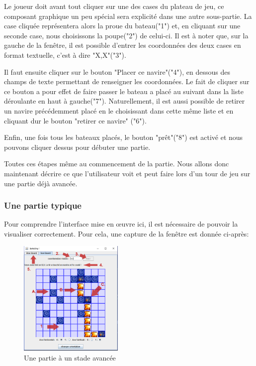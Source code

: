 	Le  joueur doit avant tout cliquer sur une des cases du plateau de jeu, ce composant graphique un peu spécial sera explicité dans une autre sous-partie. La case cliquée représentera alors la proue du bateau("1") et, en cliquant sur une seconde case, nous choisissons la poupe("2") de celui-ci. Il est à noter que, sur la gauche de la fenêtre, il est possible d'entrer les coordonnées des deux cases en format textuelle, c'est à dire "X,X"("3").
	\newline
	
	Il faut ensuite cliquer sur le bouton "Placer ce navire"("4"), en dessous des champs de texte permettant de renseigner les coordonnées. Le fait de cliquer sur ce bouton a pour effet de faire passer le bateau a placé au suivant dans la liste déroulante en haut à gauche("7"). Naturellement, il est aussi possible de retirer un navire précédemment placé en le choisissant dans cette même liste et en cliquant dur le bouton "retirer ce navire" ("6").
	\newline
	
	Enfin, une fois tous les bateaux placés, le bouton "prêt"("8") est activé et nous pouvons cliquer dessus pour débuter une partie.
	\newline
	
	Toutes ces étapes même au commencement de la partie. Nous allons donc maintenant décrire ce que l'utilisateur voit et peut faire lors d'un tour de jeu sur une partie déjà avancée.
	
	\subsubsection{Une partie typique}
	Pour comprendre l'interface mise en œuvre ici, il est nécessaire de pouvoir la visualiser correctement. Pour cela, une capture de la fenêtre est donnée ci-après:\newline
	\begin{figure}[!ht]
		\centering
		\includegraphics [width=5cm]{images/game_in_action.png}
		\caption{Une partie à un stade avancée}
	\end{figure}
	
